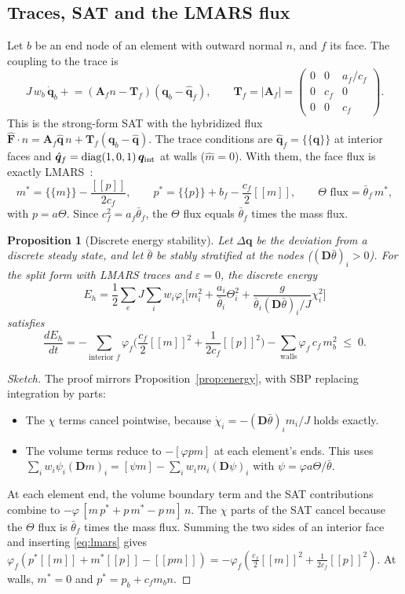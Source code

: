 \documentclass[11pt,a4paper]{article}
\newtheorem{proposition}{Proposition}
\newcommand{\avg}[1]{\{\!\{#1\}\!\}}
\newcommand{\jump}[1]{[\![#1]\!]}
\newcommand{\qh}{\hat{\bm q}}
\newcommand{\q}{\bm q}
\newcommand{\thb}{\bar\theta}
\newcommand{\D}{\bm D}
\begin{document}
\subsection{Traces, SAT and the LMARS flux}
Let $b$ be an end node of an element with outward normal $n$, and $f$ its face. The coupling to the
trace is
\begin{equation}
J\,w_b\,\dot{\q}_b \mathrel{+}= (\bm A_fn-\bm T_f)(\q_b-\qh_f),\qquad
\bm T_f=|\bm A_f|=\begin{pmatrix}0&0&a_f/c_f\\0&c_f&0\\0&0&c_f\end{pmatrix}.
\end{equation}
This is the strong-form SAT with the hybridized flux
$\widehat{\bm F}\cdot n=\bm A_f\qh\,n+\bm T_f(\q_b-\qh)$. The trace conditions are
$\qh_f=\avg{\q}$ at interior faces and $\qh_f=\operatorname{diag}(1,0,1)\,\q_{\rm int}$ at walls
($\hat m=0$). With them, the face flux is exactly LMARS~\cite{chen2013}:
\begin{equation}\label{eq:lmars}
m^\ast=\avg m-\frac{\jump{p}}{2c_f},\qquad p^\ast=\avg{p}+b_f-\frac{c_f}{2}\jump m,\qquad
\text{$\Theta$ flux}=\thb_f\,m^\ast ,
\end{equation}
with $p=a\Theta$. Since $c_f^2=a_f\thb_f$, the $\Theta$ flux equals $\thb_f$ times the mass flux.

\begin{proposition}[Discrete energy stability]\label{prop:dstab}
Let $\Delta\q$ be the deviation from a discrete steady state, and let $\thb$ be stably stratified
at the nodes ($(\D\thb)_i>0$). For the split form with LMARS traces and $\varepsilon=0$, the
discrete energy
\[
E_h=\frac12\sum_e J\sum_i w_i\varphi_i\Big[m_i^2+\frac{a_i}{\thb_i}\Theta_i^2+
\frac{g}{\thb_i(\D\thb)_i/J}\chi_i^2\Big]
\]
satisfies
\[
\frac{dE_h}{dt}=-\sum_{\text{interior }f}\varphi_f\Big(\frac{c_f}{2}\jump m^2+\frac{1}{2c_f}\jump p^2\Big)
-\sum_{\text{walls}}\varphi_f\,c_f\,m_b^2\;\le\;0 .
\]
\end{proposition}
\begin{proof}[Sketch]
The proof mirrors Proposition~\ref{prop:energy}, with SBP replacing integration by parts:
\begin{itemize}
\item The $\chi$ terms cancel pointwise, because $\dot\chi_i=-(\D\thb)_im_i/J$ holds exactly.
\item The volume terms reduce to $-[\varphi p m]$ at each element's ends. This uses
$\sum_iw_i\psi_i(\D m)_i=[\psi m]-\sum_iw_im_i(\D\psi)_i$ with $\psi=\varphi a\Theta/\thb$.
\end{itemize}
At each element end, the volume boundary term and the SAT contributions combine to
$-\varphi\,[m\,p^\ast+p\,m^\ast-p\,m]\,n$. The $\chi$ parts of the SAT cancel because the
$\Theta$ flux is $\thb_f$ times the mass flux. Summing the two sides of an interior face and
inserting \eqref{eq:lmars} gives
$\varphi_f(p^\ast\jump m+m^\ast\jump p-\jump{pm})=-\varphi_f(\tfrac{c_f}{2}\jump m^2+\tfrac{1}{2c_f}\jump p^2)$.
At walls, $m^\ast=0$ and $p^\ast=p_b+c_fm_bn$.
\end{proof}
\end{document}
